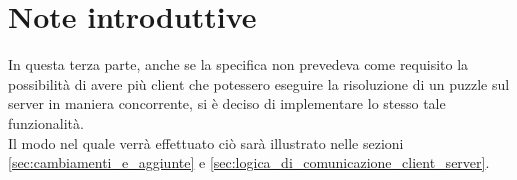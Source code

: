 % 
%
%

\section{Note introduttive} %
\label{sec:note_introduttive}
In questa terza parte, anche se la specifica non prevedeva come requisito la possibilità di avere più client che potessero eseguire la risoluzione di un puzzle sul server in maniera concorrente, si è deciso di implementare lo stesso tale funzionalità. \\
Il modo nel quale verrà effettuato ciò sarà illustrato nelle sezioni \ref{sec:cambiamenti_e_aggiunte} e \ref{sec:logica_di_comunicazione_client_server}.
